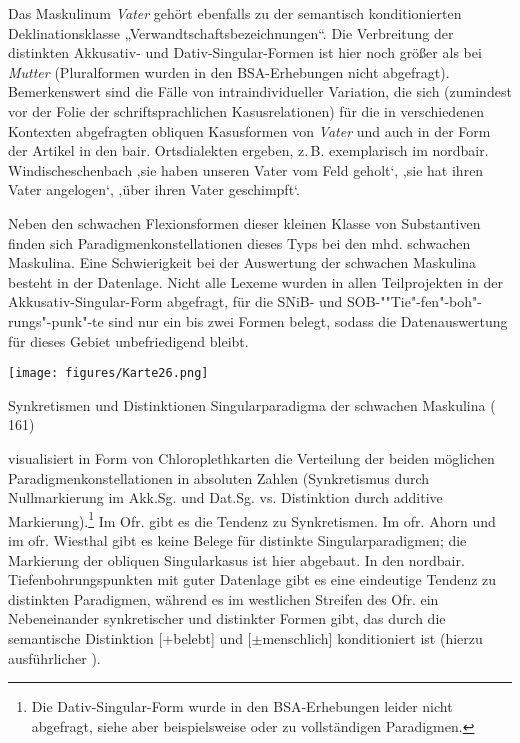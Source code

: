 Das Maskulinum \textit{Vater} gehört ebenfalls zu der semantisch konditionierten Deklinationsklasse „Verwandtschaftsbezeichnungen“. Die Verbreitung der distinkten Akkusativ- und Dativ-Singular-Formen ist hier noch größer als bei \textit{Mutter} (Pluralformen wurden in den BSA-Erhebungen nicht abgefragt). Bemerkenswert sind die Fälle von intraindividueller Variation, die sich (zumindest vor der Folie der schriftsprachlichen Kasusrelationen) für die in verschiedenen Kontexten abgefragten obliquen Kasusformen von \textit{Vater} und auch in der Form der Artikel in den bair. Ortsdialekten ergeben, z.\,B. exemplarisch im nordbair. Windischeschenbach      ‚sie haben unseren Vater vom Feld geholt‘,      ‚sie hat ihren Vater angelogen‘,     ‚über ihren Vater geschimpft‘.

Neben den schwachen Flexionsformen dieser kleinen Klasse von Substantiven finden sich Paradigmenkonstellationen dieses Typs bei den mhd. schwachen Maskulina. Eine Schwierigkeit bei der Auswertung der schwachen Maskulina besteht in der Datenlage. Nicht alle Lexeme wurden in allen Teilprojekten in der Akkusativ-Singular-Form abgefragt, für die SNiB- und SOB-""Tie"-fen"-boh"-rungs"-punk"-te sind nur ein bis zwei Formen belegt, sodass die Datenauswertung für dieses Gebiet unbefriedigend bleibt.


\begin{map}
\texttt{[image: figures/Karte26.png]}
\caption{Synkretismen und Distinktionen Singularparadigma der schwachen Maskulina ( 161)}
\label{map:26}
\end{map}

 visualisiert in Form von Chloroplethkarten die Verteilung der beiden möglichen Paradigmenkonstellationen in absoluten Zahlen (Synkretismus durch Nullmarkierung im Akk.Sg. und Dat.Sg. vs. Distinktion durch additive Markierung).\footnote{Die Dativ-Singular-Form wurde in den BSA-Erhebungen leider nicht abgefragt, siehe aber beispielsweise \citet[§20]{Micko-Repp1933} oder \citet[§7]{Schübel1955} zu vollständigen Paradigmen.}  Im Ofr. gibt es die Tendenz zu Synkretismen. Im ofr. Ahorn und im ofr. Wiesthal gibt es keine Belege für distinkte Singularparadigmen; die Markierung der obliquen Singularkasus ist hier abgebaut. In den nordbair. Tiefenbohrungspunkten mit guter Datenlage gibt es eine eindeutige Tendenz zu distinkten Paradigmen, während es im westlichen Streifen des Ofr. ein Nebeneinander synkretischer und distinkter Formen gibt, das durch die semantische Distinktion [+belebt] und [${\pm}$menschlich] konditioniert ist (hierzu ausführlicher ).

